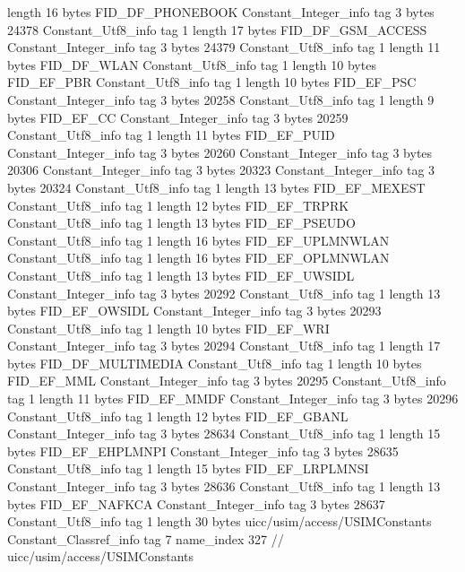 {{{			length	16
			bytes	FID_DF_PHONEBOOK
		}
		Constant_Integer_info {
			tag	3
			bytes	24378
		}
		Constant_Utf8_info {
			tag	1
			length	17
			bytes	FID_DF_GSM_ACCESS
		}
		Constant_Integer_info {
			tag	3
			bytes	24379
		}
		Constant_Utf8_info {
			tag	1
			length	11
			bytes	FID_DF_WLAN
		}
		Constant_Utf8_info {
			tag	1
			length	10
			bytes	FID_EF_PBR
		}
		Constant_Utf8_info {
			tag	1
			length	10
			bytes	FID_EF_PSC
		}
		Constant_Integer_info {
			tag	3
			bytes	20258
		}
		Constant_Utf8_info {
			tag	1
			length	9
			bytes	FID_EF_CC
		}
		Constant_Integer_info {
			tag	3
			bytes	20259
		}
		Constant_Utf8_info {
			tag	1
			length	11
			bytes	FID_EF_PUID
		}
		Constant_Integer_info {
			tag	3
			bytes	20260
		}
		Constant_Integer_info {
			tag	3
			bytes	20306
		}
		Constant_Integer_info {
			tag	3
			bytes	20323
		}
		Constant_Integer_info {
			tag	3
			bytes	20324
		}
		Constant_Utf8_info {
			tag	1
			length	13
			bytes	FID_EF_MEXEST
		}
		Constant_Utf8_info {
			tag	1
			length	12
			bytes	FID_EF_TRPRK
		}
		Constant_Utf8_info {
			tag	1
			length	13
			bytes	FID_EF_PSEUDO
		}
		Constant_Utf8_info {
			tag	1
			length	16
			bytes	FID_EF_UPLMNWLAN
		}
		Constant_Utf8_info {
			tag	1
			length	16
			bytes	FID_EF_OPLMNWLAN
		}
		Constant_Utf8_info {
			tag	1
			length	13
			bytes	FID_EF_UWSIDL
		}
		Constant_Integer_info {
			tag	3
			bytes	20292
		}
		Constant_Utf8_info {
			tag	1
			length	13
			bytes	FID_EF_OWSIDL
		}
		Constant_Integer_info {
			tag	3
			bytes	20293
		}
		Constant_Utf8_info {
			tag	1
			length	10
			bytes	FID_EF_WRI
		}
		Constant_Integer_info {
			tag	3
			bytes	20294
		}
		Constant_Utf8_info {
			tag	1
			length	17
			bytes	FID_DF_MULTIMEDIA
		}
		Constant_Utf8_info {
			tag	1
			length	10
			bytes	FID_EF_MML
		}
		Constant_Integer_info {
			tag	3
			bytes	20295
		}
		Constant_Utf8_info {
			tag	1
			length	11
			bytes	FID_EF_MMDF
		}
		Constant_Integer_info {
			tag	3
			bytes	20296
		}
		Constant_Utf8_info {
			tag	1
			length	12
			bytes	FID_EF_GBANL
		}
		Constant_Integer_info {
			tag	3
			bytes	28634
		}
		Constant_Utf8_info {
			tag	1
			length	15
			bytes	FID_EF_EHPLMNPI
		}
		Constant_Integer_info {
			tag	3
			bytes	28635
		}
		Constant_Utf8_info {
			tag	1
			length	15
			bytes	FID_EF_LRPLMNSI
		}
		Constant_Integer_info {
			tag	3
			bytes	28636
		}
		Constant_Utf8_info {
			tag	1
			length	13
			bytes	FID_EF_NAFKCA
		}
		Constant_Integer_info {
			tag	3
			bytes	28637
		}
		Constant_Utf8_info {
			tag	1
			length	30
			bytes	uicc/usim/access/USIMConstants
		}
		Constant_Classref_info {
			tag	7
			name_index	327		// uicc/usim/access/USIMConstants
}}}
